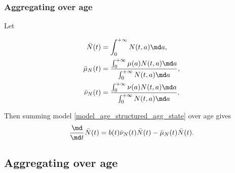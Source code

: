 \documentclass{jpmarticle}
\let\subequationsorig\subequations%
\let\endsubequationsorig\endsubequations%
\renewenvironment{subequations}{
  \subequationsorig
  \renewcommand{\theequation}{\theparentequation.\arabic{equation}}
}{
  \endsubequationsorig
}
\begin{document}
\subsubsection{Aggregating over age}

Let
\begin{subequations}
  \begin{align}
    \bar{N}(t)
    &= \int_0^{+\infty} N(t, a) \md a,
    \\
    \bar{\mu}_N(t)
    &= \frac{\int_0^{+\infty} \mu(a) N(t, a) \md a}
    {\int_0^{+\infty} N(t, a) \md a},
    \\
    \bar{\nu}_N(t)
    &= \frac{\int_0^{+\infty} \nu(a) N(t, a) \md a}
    {\int_0^{+\infty} N(t, a) \md a}.
  \end{align}
\end{subequations}
Then summing model \eqref{model_age_structured_agg_state} over age gives
\begin{equation}
  \label{model_age_structured_agg_state_age}
  \frac{\md}{\md t} \bar{N}(t)
  = b(t) \bar{\nu}_N(t) \bar{N}(t)
  - \bar{\mu}_N(t) \bar{N}(t).
\end{equation}


\subsection{Aggregating over age}
\end{document}
